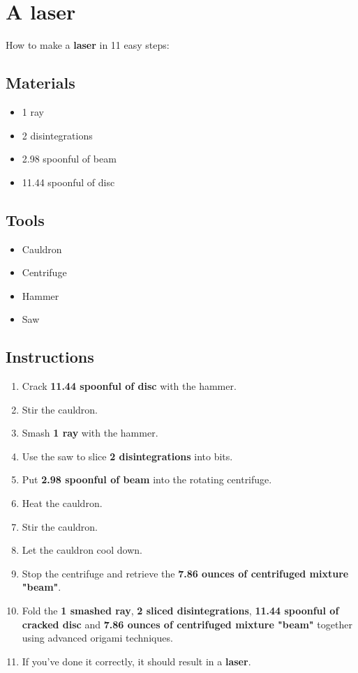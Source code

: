 \documentclass{article}
\begin{document}
\section{A laser}How to make a \textbf{laser} in 11 easy steps:

\subsection{Materials}\begin{itemize}
\item 
1 ray
\item 
2 disintegrations
\item 
2.98 spoonful of beam
\item 
11.44 spoonful of disc
\end{itemize}
\subsection{Tools}\begin{itemize}
\item 
Cauldron
\item 
Centrifuge
\item 
Hammer
\item 
Saw
\end{itemize}
\subsection{Instructions}\begin{enumerate}
\item 
Crack \textbf{11.44 spoonful of disc} with the hammer.
\item 
Stir the cauldron.
\item 
Smash \textbf{1 ray} with the hammer.
\item 
Use the saw to slice \textbf{2 disintegrations} into bits.
\item 
Put \textbf{2.98 spoonful of beam} into the rotating centrifuge.
\item 
Heat the cauldron.
\item 
Stir the cauldron.
\item 
Let the cauldron cool down.
\item 
Stop the centrifuge and retrieve the \textbf{7.86 ounces of centrifuged mixture "beam"}.
\item 
Fold the \textbf{1 smashed ray}, \textbf{2 sliced disintegrations}, \textbf{11.44 spoonful of cracked disc} and \textbf{7.86 ounces of centrifuged mixture "beam"} together using advanced origami techniques.
\item 
If you've done it correctly, it should result in a \textbf{laser}.
\end{enumerate}
\newpage
\end{document}
